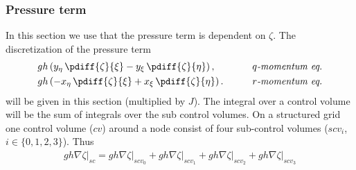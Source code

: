 \subsubsection{Pressure term} \label{sec:linearized_pressure_zeta}
In this section we use that the pressure term is dependent on $\zeta$.
The discretization of the pressure term
\begin{align}
    &g h \left( y_{\eta}\, \pdiff{\zeta}{\xi} - y_{\xi}\, \pdiff{\zeta}{\eta} \right), \qquad &\textit{$q$-momentum eq.}
    \\*
    &g h \left( -x_{\eta}\, \pdiff{\zeta}{\xi} + x_{\xi}\, \pdiff{\zeta}{\eta} \right). \qquad &\textit{$r$-momentum eq.}
\end{align}
will be given in this section (multiplied by $J$).
The integral over a control volume will be the sum of integrals over the sub control volumes.
On a structured grid one control volume ($cv$) around a node consist of four sub-control volumes ($scv_i$, $i\in\{0,1,2,3\}$).
Thus
\begin{align}
    gh \nabla \zeta\big|_{sc} =
    gh \nabla \zeta\big|_{scv_0} +
    gh \nabla \zeta\big|_{scv_1} +
    gh \nabla \zeta\big|_{scv_2} +
    gh \nabla \zeta\big|_{scv_3}
\end{align}
%
